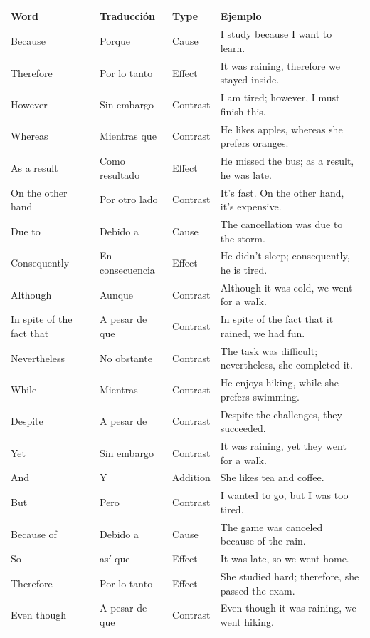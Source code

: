 \begin{longtable}{|l|l|l|p{5cm}|}
    \hline
    \textbf{Word} & \textbf{Traducción} & \textbf{Type} & \textbf{Ejemplo} \\ \hline
    \endhead
    Because & Porque & Cause & I study because I want to learn. \\ \hline
    Therefore & Por lo tanto & Effect & It was raining, therefore we stayed inside. \\ \hline
    However & Sin embargo & Contrast & I am tired; however, I must finish this. \\ \hline
    Whereas & Mientras que & Contrast & He likes apples, whereas she prefers oranges. \\ \hline
    As a result & Como resultado & Effect & He missed the bus; as a result, he was late. \\ \hline
    On the other hand & Por otro lado & Contrast & It's fast. On the other hand, it's expensive. \\ \hline
    Due to & Debido a & Cause & The cancellation was due to the storm. \\ \hline
    Consequently & En consecuencia & Effect & He didn't sleep; consequently, he is tired. \\ \hline
    Although & Aunque & Contrast & Although it was cold, we went for a walk. \\ \hline
    In spite of the fact that & A pesar de que & Contrast & In spite of the fact that it rained, we had fun. \\ \hline
    Nevertheless & No obstante & Contrast & The task was difficult; nevertheless, she completed it. \\ \hline
    While & Mientras & Contrast & He enjoys hiking, while she prefers swimming. \\ \hline
    Despite & A pesar de & Contrast & Despite the challenges, they succeeded. \\ \hline
    Yet & Sin embargo & Contrast & It was raining, yet they went for a walk. \\ \hline
    And & Y & Addition & She likes tea and coffee. \\ \hline
    But & Pero & Contrast & I wanted to go, but I was too tired. \\ \hline
    Because of & Debido a & Cause & The game was canceled because of the rain. \\ \hline
    So & así que & Effect & It was late, so we went home. \\ \hline
    Therefore & Por lo tanto & Effect & She studied hard; therefore, she passed the exam. \\ \hline
    Even though & A pesar de que & Contrast & Even though it was raining, we went hiking. \\ \hline
\end{longtable}


